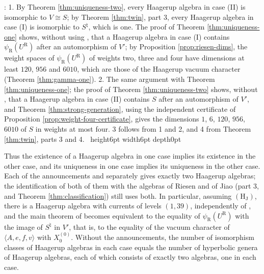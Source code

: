 \documentclass[leqno]{article}
\newcommand{\la}{\langle}
\newcommand{\ra}{\rangle}
\newcommand{\qed}{\hfill \vrule height6pt  width6pt depth0pt}
\newenvironment{proof}[1][]{\noindent {\it Proof #1} : }{\hbox{~}\qed
\smallskip
}
\numberwithin{equation}{section}
\begin{document}
\begin{proof}
1. By Theorem \ref{thm:uniqueness-two}, every Haagerup algebra in case (II) is isomorphic to $V \cong S$; by Theorem \ref{thm:twin}, part 3, every Haagerup algebra in case (I) is isomorphic to $S^\natural$, which is one. The proof of Theorem \ref{thm:uniqueness-one} shows, without using \cite{Rie26}, that a Haagerup algebra in case (I) contains $\psi_{\mathrm R}(U^{\mathrm R})$ after an automorphism of $V'$; by Proposition \ref{prop:riesen-dims}, the weight spaces of $\psi_{\mathrm R}(U^{\mathrm R})$ of weights two, three and four have dimensions at least $120$, $956$ and $6010$, which are those of the Haagerup vacuum character (Theorem \ref{thm:gamma-one}). 2. The same argument with Theorem \ref{thm:uniqueness-one}; the proof of Theorem \ref{thm:uniqueness-two} shows, without \cite{Jia26}, that a Haagerup algebra in case (II) contains $S$ after an automorphism of $V'$, and Theorem \ref{thm:strong-generation}, using the independent certificate of Proposition \ref{prop:weight-four-certificate}, gives the dimensions $1$, $6$, $120$, $956$, $6010$ of $S$ in weights at most four. 3 follows from 1 and 2, and 4 from Theorem \ref{thm:twin}, parts 3 and 4.
\end{proof}

Thus the existence of a Haagerup algebra in one case implies its existence in the other case, and its uniqueness in one case implies its uniqueness in the other case. Each of the announcements \cite{Rie26} and \cite{Jia26} separately gives exactly two Haagerup algebras; the identification of both of them with the algebras of Riesen and of Jiao (part 3, and Theorem \ref{thm:classification}) still uses both. In particular, assuming $\mathrm{(H_J)}$, there is a Haagerup algebra with currents of levels $(1,39)$, independently of \cite{Rie26}, and the main theorem of \cite{Rie26} becomes equivalent to the equality of $\psi_{\mathrm R}(U^{\mathrm R})$ with the image of $S^\natural$ in $V'$, that is, to the equality of the vacuum character of $\la A,e,f,v\ra$ with $X^{(0)}_0$.%
Without the announcements, the number of isomorphism classes of Haagerup algebras in each case equals the number of hyperbolic genera of Haagerup algebras, each of which consists of exactly two algebras, one in each case.
\end{document}
